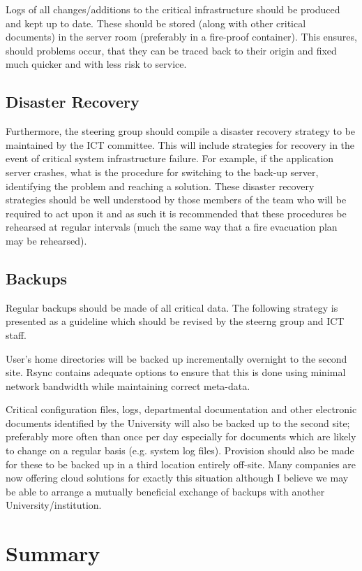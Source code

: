 \documentclass[a4paper, twoside]{article}
\begin{document}
Logs of all changes/additions to the critical infrastructure should be produced
and kept up to date. These should be stored (along with other critical
documents) in the server room (preferably in a fire-proof container). This
ensures, should problems occur, that they can be traced back to their origin and
fixed much quicker and with less risk to service.

\subsection{Disaster Recovery}
Furthermore, the steering group should compile a disaster recovery strategy to
be maintained by the ICT committee. This will include strategies for recovery in
the event of critical system infrastructure failure. For example, if the
application server crashes, what is the procedure for switching to the back-up
server, identifying the problem and reaching a solution. These disaster recovery
strategies should be well understood by those members of the team who will be
required to act upon it and as such it is recommended that these procedures be
rehearsed at regular intervals (much the same way that a fire evacuation plan
may be rehearsed).

\subsection{Backups}
Regular backups should be made of all critical data. The following strategy is
presented as a guideline which should be revised by the steerng group and ICT
staff.

User's home directories will be backed up incrementally overnight to the second
site. Rsync contains adequate options to ensure that this is done using minimal
network bandwidth while maintaining correct meta-data.

Critical configuration files, logs, departmental documentation and other
electronic documents identified by the University will also be backed up to the
second site; preferably more often than once per day especially for documents
which are likely to change on a regular basis (e.g. system log files). Provision
should also be made for these to be backed up in a third location entirely
off-site. Many companies are now offering cloud solutions for exactly this
situation although I believe we may be able to arrange a mutually beneficial
exchange of backups with another University/institution.

\section{Summary}
\end{document}
